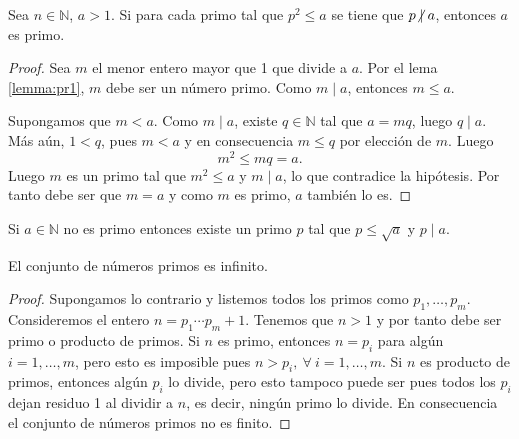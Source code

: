 \begin{theorem}[Eratóstenes]
Sea $n\in \mathbb{N}$, $a>1$. Si para cada primo tal que $p^2\leq a$ se tiene que $p \centernot\mid a$, entonces $a$ es primo.
\end{theorem}
\begin{proof}
Sea $m$ el menor entero mayor que 1 que divide a $a$. Por el lema \eqref{lemma:pr1}, $m$ debe ser un número primo. Como $m \mid a$, entonces $m\leq a$.
\bigskip

Supongamos que $m<a$. Como $m \mid a$, existe $q\in \mathbb{N}$ tal que $a=mq$, luego $q \mid a$. Más aún, $1<q$, pues $m<a$ y en consecuencia $m\leq q$ por elección de $m$. Luego
\begin{equation*}
	m^2\leq mq=a.
\end{equation*}
Luego $m$ es un primo tal que $m^2\leq a$ y $m \mid a$, lo que contradice la hipótesis. Por tanto debe ser que $m=a$ y como $m$ es primo, $a$ también lo es.
\end{proof} \begin{corollary}
Si $a\in\mathbb{N}$ no es primo entonces existe un primo $p$ tal que $p\leq \sqrt{a}$ y $p \mid a$.
\end{corollary}

\begin{theorem}[Euclides]
El conjunto de números primos es infinito.
\end{theorem}
\begin{proof}
Supongamos lo contrario y listemos todos los primos como $p_1,\ldots ,p_m$. Consideremos el entero $n=p_1\cdots p_m+1$. Tenemos que $n>1$ y por tanto debe ser primo o producto de primos. Si $n$ es primo, entonces $n=p_i$ para algún $i=1,\ldots ,m$, pero esto es imposible pues $n>p_i,\:\forall \: i=1,\ldots ,m$. Si $n$ es producto de primos, entonces algún $p_i$ lo divide, pero esto tampoco puede ser pues todos los $p_i$ dejan residuo 1 al dividir a $n$, es decir, ningún primo lo divide. En consecuencia el conjunto de números primos no es finito.
\end{proof}
